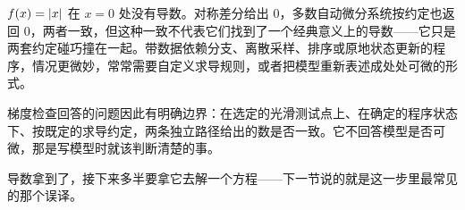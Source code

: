 \(f(x)=\left|x\right|\) 在 \(x=0\) 处没有导数。对称差分给出 \(0\)，多数自动微分系统按约定也返回 \(0\)，两者一致，但这种一致不代表它们找到了一个经典意义上的导数——它只是两套约定碰巧撞在一起。带数据依赖分支、离散采样、排序或原地状态更新的程序，情况更微妙，常常需要自定义求导规则，或者把模型重新表述成处处可微的形式。

梯度检查回答的问题因此有明确边界：在选定的光滑测试点上、在确定的程序状态下、按既定的求导约定，两条独立路径给出的数是否一致。它不回答模型是否可微，那是写模型时就该判断清楚的事。

导数拿到了，接下来多半要拿它去解一个方程——下一节说的就是这一步里最常见的那个误译。
